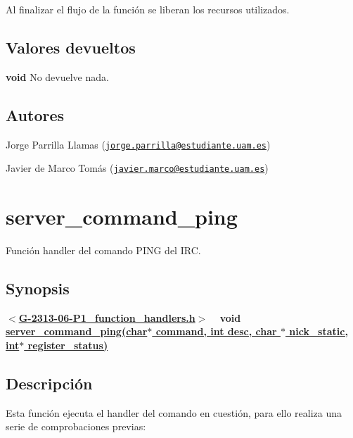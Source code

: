 Al finalizar el flujo de la función se liberan los recursos utilizados.\hypertarget{server_command_quit_return_quit}{}\subsection{Valores devueltos}\label{server_command_quit_return_quit}

\begin{DoxyItemize}
\item {\bfseries void} No devuelve nada. 
\end{DoxyItemize}\hypertarget{server_command_quit_authors_quit}{}\subsection{Autores}\label{server_command_quit_authors_quit}

\begin{DoxyItemize}
\item Jorge Parrilla Llamas (\href{mailto:jorge.parrilla@estudiante.uam.es}{\tt jorge.\+parrilla@estudiante.\+uam.\+es}) 
\item Javier de Marco Tomás (\href{mailto:javier.marco@estudiante.uam.es}{\tt javier.\+marco@estudiante.\+uam.\+es}) 
\end{DoxyItemize}\hypertarget{server_command_ping}{}\section{server\+\_\+command\+\_\+ping}\label{server_command_ping}
Función handler del comando P\+I\+N\+G del I\+R\+C.\hypertarget{server_command_ping_synopsis_ping}{}\subsection{Synopsis}\label{server_command_ping_synopsis_ping}
{ {\bfseries $<$\hyperlink{G-2313-06-P1__function__handlers_8h}{G-\/2313-\/06-\/\+P1\+\_\+function\+\_\+handlers.\+h}$>$} ~\newline
 {\bfseries void \hyperlink{G-2313-06-P1__function__handlers_8c_acc1c181bf44087b9216d1b59809937aa}{server\+\_\+command\+\_\+ping(char$\ast$ command, int desc, char $\ast$ nick\+\_\+static, int$\ast$ register\+\_\+status)}} } \hypertarget{server_command_ping_descripcion_ping}{}\subsection{Descripción}\label{server_command_ping_descripcion_ping}
Esta función ejecuta el handler del comando en cuestión, para ello realiza una serie de comprobaciones previas\+:


